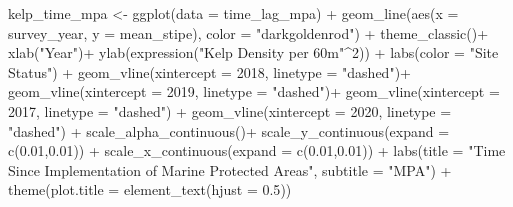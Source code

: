 \documentclass[
]{article}
\newenvironment{Shaded}{\begin{snugshade}}{\end{snugshade}}
\newcommand{\AttributeTok}[1]{\textcolor[rgb]{0.77,0.63,0.00}{#1}}
\newcommand{\DecValTok}[1]{\textcolor[rgb]{0.00,0.00,0.81}{#1}}
\newcommand{\FloatTok}[1]{\textcolor[rgb]{0.00,0.00,0.81}{#1}}
\newcommand{\FunctionTok}[1]{\textcolor[rgb]{0.00,0.00,0.00}{#1}}
\newcommand{\NormalTok}[1]{#1}
\newcommand{\OtherTok}[1]{\textcolor[rgb]{0.56,0.35,0.01}{#1}}
\newcommand{\SpecialCharTok}[1]{\textcolor[rgb]{0.00,0.00,0.00}{#1}}
\newcommand{\StringTok}[1]{\textcolor[rgb]{0.31,0.60,0.02}{#1}}
\begin{document}
\begin{Shaded}
\begin{Highlighting}[]
\NormalTok{kelp\_time\_mpa }\OtherTok{\textless{}{-}} \FunctionTok{ggplot}\NormalTok{(}\AttributeTok{data =}\NormalTok{ time\_lag\_mpa) }\SpecialCharTok{+}
  \FunctionTok{geom\_line}\NormalTok{(}\FunctionTok{aes}\NormalTok{(}\AttributeTok{x =}\NormalTok{ survey\_year, }\AttributeTok{y =}\NormalTok{ mean\_stipe), }\AttributeTok{color =} \StringTok{"darkgoldenrod"}\NormalTok{) }\SpecialCharTok{+}
  \FunctionTok{theme\_classic}\NormalTok{()}\SpecialCharTok{+}
  \FunctionTok{xlab}\NormalTok{(}\StringTok{"Year"}\NormalTok{)}\SpecialCharTok{+}
  \FunctionTok{ylab}\NormalTok{(}\FunctionTok{expression}\NormalTok{(}\StringTok{"Kelp Density per 60m"}\SpecialCharTok{\^{}}\DecValTok{2}\NormalTok{)) }\SpecialCharTok{+}
  \FunctionTok{labs}\NormalTok{(}\AttributeTok{color =} \StringTok{"Site Status"}\NormalTok{) }\SpecialCharTok{+}
  \FunctionTok{geom\_vline}\NormalTok{(}\AttributeTok{xintercept =} \DecValTok{2018}\NormalTok{, }\AttributeTok{linetype =} \StringTok{"dashed"}\NormalTok{)}\SpecialCharTok{+}
  \FunctionTok{geom\_vline}\NormalTok{(}\AttributeTok{xintercept =} \DecValTok{2019}\NormalTok{, }\AttributeTok{linetype =} \StringTok{"dashed"}\NormalTok{)}\SpecialCharTok{+}
  \FunctionTok{geom\_vline}\NormalTok{(}\AttributeTok{xintercept =} \DecValTok{2017}\NormalTok{, }\AttributeTok{linetype =} \StringTok{"dashed"}\NormalTok{) }\SpecialCharTok{+}
  \FunctionTok{geom\_vline}\NormalTok{(}\AttributeTok{xintercept =} \DecValTok{2020}\NormalTok{, }\AttributeTok{linetype =} \StringTok{"dashed"}\NormalTok{) }\SpecialCharTok{+}
  \FunctionTok{scale\_alpha\_continuous}\NormalTok{()}\SpecialCharTok{+}
  \FunctionTok{scale\_y\_continuous}\NormalTok{(}\AttributeTok{expand =} \FunctionTok{c}\NormalTok{(}\FloatTok{0.01}\NormalTok{,}\FloatTok{0.01}\NormalTok{)) }\SpecialCharTok{+}
  \FunctionTok{scale\_x\_continuous}\NormalTok{(}\AttributeTok{expand =} \FunctionTok{c}\NormalTok{(}\FloatTok{0.01}\NormalTok{,}\FloatTok{0.01}\NormalTok{)) }\SpecialCharTok{+}
  \FunctionTok{labs}\NormalTok{(}\AttributeTok{title =} \StringTok{"Time Since Implementation of Marine Protected Areas"}\NormalTok{, }\AttributeTok{subtitle =} \StringTok{"MPA"}\NormalTok{) }\SpecialCharTok{+}
  \FunctionTok{theme}\NormalTok{(}\AttributeTok{plot.title =} \FunctionTok{element\_text}\NormalTok{(}\AttributeTok{hjust =} \FloatTok{0.5}\NormalTok{))}



\end{Highlighting}
\end{Shaded}
\end{document}
